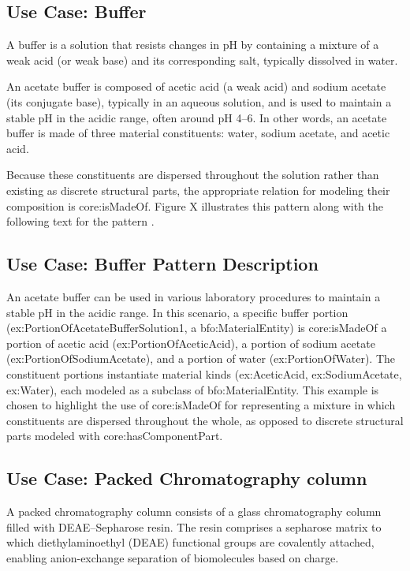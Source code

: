 \subsection*{Use Case: Buffer}
A buffer is a solution that resists changes in pH by containing a mixture of a weak acid (or weak base) and its corresponding salt, typically dissolved in water.

An acetate buffer is composed of acetic acid (a weak acid) and sodium acetate (its conjugate base), typically in an aqueous solution, and is used to maintain a stable pH in the acidic range, often around pH 4–6. In other words, an acetate buffer is made of three material constituents: water, sodium acetate, and acetic acid.

Because these constituents are dispersed throughout the solution rather than existing as discrete structural parts, the appropriate relation for modeling their composition is core:isMadeOf. Figure X illustrates this pattern along with the following text for the pattern .


\subsection*{Use Case: Buffer Pattern Description}
An acetate buffer can be used in various laboratory procedures to maintain a stable pH in the acidic range. In this scenario, a specific buffer portion (ex:PortionOfAcetateBufferSolution1, a bfo:MaterialEntity) is core:isMadeOf a portion of acetic acid (ex:PortionOfAceticAcid), a portion of sodium acetate (ex:PortionOfSodiumAcetate), and a portion of water (ex:PortionOfWater). The constituent portions instantiate material kinds (ex:AceticAcid, ex:SodiumAcetate, ex:Water), each modeled as a subclass of bfo:MaterialEntity.
This example is chosen to highlight the use of core:isMadeOf for representing a mixture in which constituents are dispersed throughout the whole, as opposed to discrete structural parts modeled with core:hasComponentPart.


\subsection*{Use Case: Packed Chromatography column}
A packed chromatography column consists of a glass chromatography column filled with DEAE–Sepharose resin. The resin comprises a sepharose matrix to which diethylaminoethyl (DEAE) functional groups are covalently attached, enabling anion-exchange separation of biomolecules based on charge.

